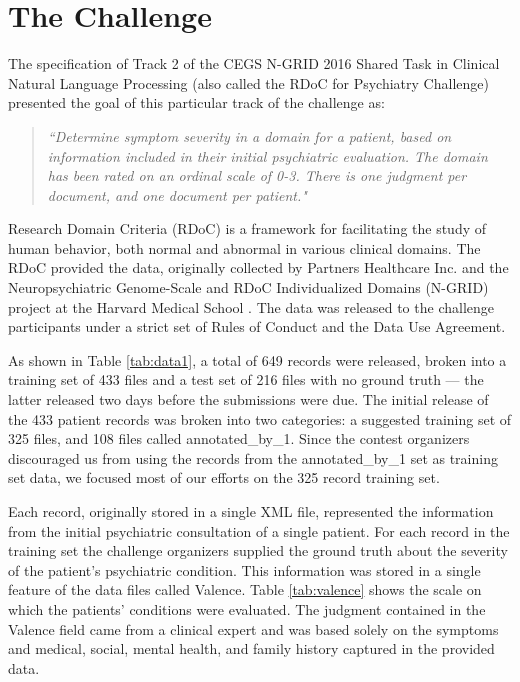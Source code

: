 \chapter{The Challenge}\label{sec:challenge}

The specification of Track 2 of the CEGS N-GRID 2016 Shared Task in Clinical Natural Language Processing  (also called the RDoC for Psychiatry Challenge) presented 
the goal of this particular track of the challenge as:
\begin{quote}
\textsl{``Determine symptom severity in a domain for a patient, based on information included in their initial psychiatric evaluation. The domain has been rated on an ordinal scale of 0-3. There is one judgment per document, and one document per patient."}\cite{N-GRID}
\end{quote}

Research Domain Criteria (RDoC) is a framework for facilitating the study of human behavior,
both normal and abnormal in various clinical domains. The RDoC provided the data,
originally collected by Partners Healthcare Inc. and the Neuropsychiatric Genome-Scale and RDoC
Individualized Domains (N-GRID) project at the Harvard Medical School \cite{N-GRID}.  The data
was released to the challenge participants under a strict set of Rules of Conduct and the Data Use Agreement.

As shown in Table \ref{tab:data1}, a total of 649 records were released,  broken into a training set of 433 files and 
a test set of 216 files with no ground truth --- the latter released two days before
the submissions were due. The initial release of the 433 patient records was broken into two categories: a suggested training set of 325 files, and 108 files
called \textsf{annotated\_by\_1}. Since the contest organizers discouraged us from using the records from the \textsf{annotated\_by\_1} set as training set data, we focused 
most of our efforts on the 325 record training set.

Each record, originally stored in a single XML file, represented the information from the
initial psychiatric consultation of a single patient. For each record in the training set the challenge organizers supplied the ground truth
about the severity of the patient's psychiatric condition. This information was stored in
a single feature of the data files called \textsf{Valence}.  Table \ref{tab:valence} shows the
scale on which the patients' conditions were evaluated.  The judgment contained in the \textsf{Valence}
field came from a clinical expert and was based solely on the symptoms and medical, social, 
mental health, and family history captured in the provided data.

